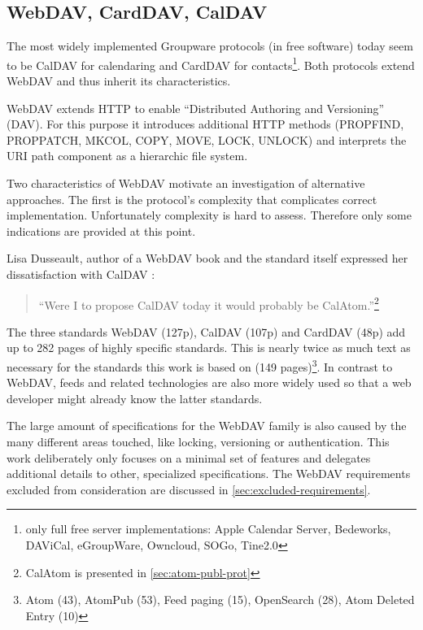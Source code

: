 \documentclass[11pt,a4paper,headsepline,twoside]{scrartcl}		%
\begin{document}
\subsection{WebDAV, CardDAV, CalDAV}
\label{sec:carddav-caldav}

The most widely implemented Groupware protocols (in free software) today seem to
be CalDAV \cite{RFC4791} for calendaring and CardDAV \cite{RFC6352} for
contacts\footnote{only full free server implementations: Apple Calendar Server,
  Bedeworks, DAViCal, eGroupWare, Owncloud, SOGo, Tine2.0}. Both protocols
extend WebDAV \cite{RFC4918} and thus inherit its characteristics.

WebDAV extends HTTP to enable ``Distributed Authoring and Versioning''
(DAV). For this purpose it introduces additional HTTP methods (PROPFIND,
PROPPATCH, MKCOL, COPY, MOVE, LOCK, UNLOCK) and interprets the URI path
component as a hierarchic file system.

Two characteristics of WebDAV motivate an investigation of alternative
approaches. The first is the protocol's complexity that complicates correct
implementation. Unfortunately complexity is hard to assess. Therefore only some
indications are provided at this point.

Lisa Dusseault, author of a WebDAV book \cite{Dusseault2004} and the standard
itself expressed her dissatisfaction with CalDAV \cite{Dusseault2008}:

\begin{quote}
``Were I to propose CalDAV today it would probably be CalAtom.''\footnote{CalAtom is presented in \autoref{sec:atom-publ-prot}}
\end{quote}

The three standards WebDAV (127p), CalDAV (107p) and CardDAV (48p) add up to 282
pages of highly specific standards. This is nearly twice as much text as
necessary for the standards this work is based on (149 pages)\footnote{Atom
  (43), AtomPub (53), Feed paging (15), OpenSearch (28), Atom Deleted Entry
  (10)}. In contrast to WebDAV, feeds and related technologies are also more
widely used so that a web developer might already know the latter standards.

The large amount of specifications for the WebDAV family is also caused by the
many different areas touched, like locking, versioning or authentication. This
work deliberately only focuses on a minimal set of features and delegates
additional details to other, specialized specifications. The WebDAV requirements
excluded from consideration are discussed in \ref{sec:excluded-requirements}.
\end{document}
